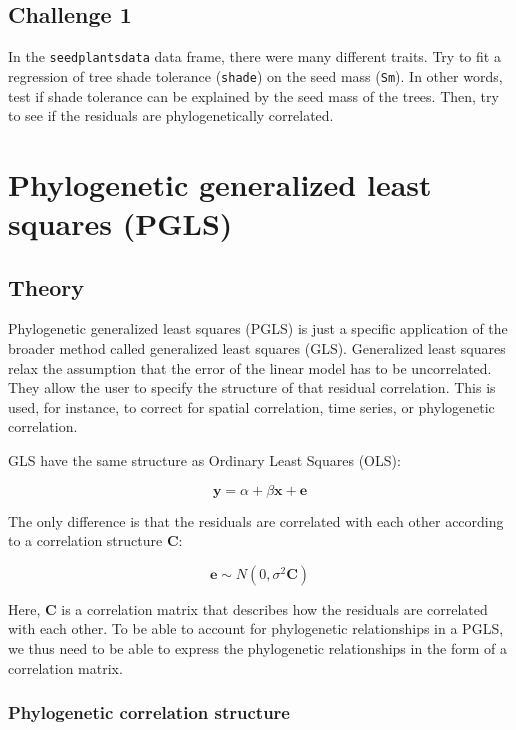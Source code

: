 \documentclass[
]{book}
\begin{document}
\section{Challenge 1}\label{challenge-1}

In the \texttt{seedplantsdata} data frame, there were many different traits. Try to fit a regression of tree shade tolerance (\texttt{shade}) on the seed mass (\texttt{Sm}). In other words, test if shade tolerance can be explained by the seed mass of the trees. Then, try to see if the residuals are phylogenetically correlated.

\chapter{Phylogenetic generalized least squares (PGLS)}\label{pgls}

\section{Theory}\label{theory-1}

Phylogenetic generalized least squares (PGLS) is just a specific application of the broader method called generalized least squares (GLS). Generalized least squares relax the assumption that the error of the linear model has to be uncorrelated. They allow the user to specify the structure of that residual correlation. This is used, for instance, to correct for spatial correlation, time series, or phylogenetic correlation.

GLS have the same structure as Ordinary Least Squares (OLS):

\[\textbf{y} = \alpha + \beta \textbf{x} + \textbf{e}\]

The only difference is that the residuals are correlated with each other according to a correlation structure \(\textbf{C}\):

\[\textbf{e} \sim N(0,\sigma^2\textbf{C})\]

Here, \(\textbf{C}\) is a correlation matrix that describes how the residuals are correlated with each other. To be able to account for phylogenetic relationships in a PGLS, we thus need to be able to express the phylogenetic relationships in the form of a correlation matrix.

\subsection{Phylogenetic correlation structure}\label{phylogenetic-correlation-structure}
\end{document}
